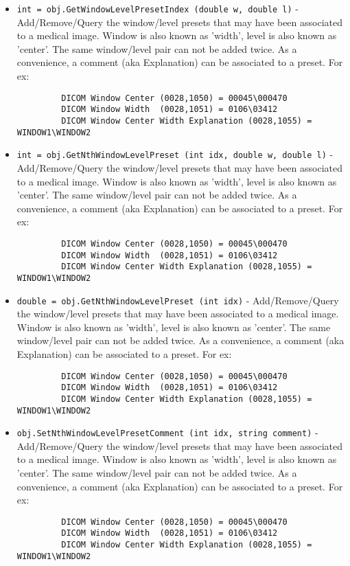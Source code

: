 \begin{itemize}
\item  \verb|int = obj.GetWindowLevelPresetIndex (double w, double l)| -  Add/Remove/Query the window/level presets that may have been associated
 to a medical image. Window is also known as 'width', level is also known
 as 'center'. The same window/level pair can not be added twice.
 As a convenience, a comment (aka Explanation) can be associated to
 a preset.
 For ex:
 \begin{verbatim}
         DICOM Window Center (0028,1050) = 00045\000470
         DICOM Window Width  (0028,1051) = 0106\03412
         DICOM Window Center Width Explanation (0028,1055) = WINDOW1\WINDOW2
 \end{verbatim}

\item  \verb|int = obj.GetNthWindowLevelPreset (int idx, double w, double l)| -  Add/Remove/Query the window/level presets that may have been associated
 to a medical image. Window is also known as 'width', level is also known
 as 'center'. The same window/level pair can not be added twice.
 As a convenience, a comment (aka Explanation) can be associated to
 a preset.
 For ex:
 \begin{verbatim}
         DICOM Window Center (0028,1050) = 00045\000470
         DICOM Window Width  (0028,1051) = 0106\03412
         DICOM Window Center Width Explanation (0028,1055) = WINDOW1\WINDOW2
 \end{verbatim}

\item  \verb|double = obj.GetNthWindowLevelPreset (int idx)| -  Add/Remove/Query the window/level presets that may have been associated
 to a medical image. Window is also known as 'width', level is also known
 as 'center'. The same window/level pair can not be added twice.
 As a convenience, a comment (aka Explanation) can be associated to
 a preset.
 For ex:
 \begin{verbatim}
         DICOM Window Center (0028,1050) = 00045\000470
         DICOM Window Width  (0028,1051) = 0106\03412
         DICOM Window Center Width Explanation (0028,1055) = WINDOW1\WINDOW2
 \end{verbatim}

\item  \verb|obj.SetNthWindowLevelPresetComment (int idx, string comment)| -  Add/Remove/Query the window/level presets that may have been associated
 to a medical image. Window is also known as 'width', level is also known
 as 'center'. The same window/level pair can not be added twice.
 As a convenience, a comment (aka Explanation) can be associated to
 a preset.
 For ex:
 \begin{verbatim}
         DICOM Window Center (0028,1050) = 00045\000470
         DICOM Window Width  (0028,1051) = 0106\03412
         DICOM Window Center Width Explanation (0028,1055) = WINDOW1\WINDOW2
 \end{verbatim}


\end{itemize}
